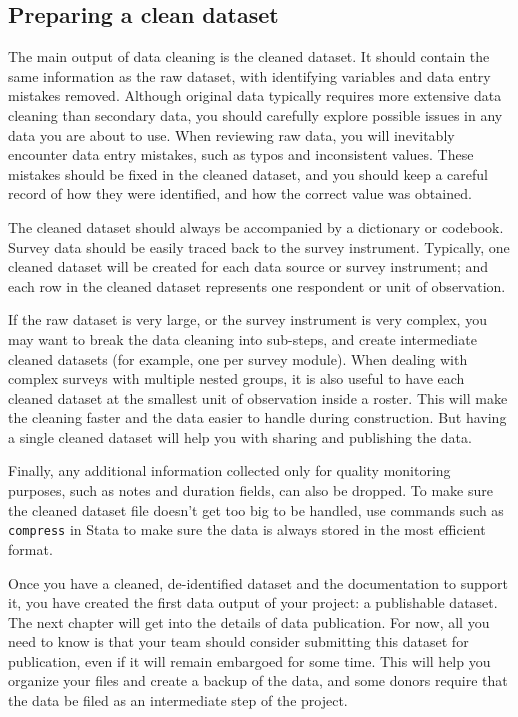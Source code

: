 \subsection{Preparing a clean dataset}
The main output of data cleaning is the cleaned dataset.
It should contain the same information as the raw dataset,
with identifying variables and data entry mistakes removed.
Although original data typically requires more extensive data cleaning than secondary data,
you should carefully explore possible issues in any data you are about to use.
When reviewing raw data, you will inevitably encounter data entry mistakes,
such as typos and inconsistent values.
These mistakes should be fixed in the cleaned dataset,
and you should keep a careful record of how they were identified,
and how the correct value was obtained.

The cleaned dataset should always be accompanied by a dictionary or codebook.
Survey data should be easily traced back to the survey instrument.
Typically, one cleaned dataset will be created for each data source
or survey instrument; and each row in the cleaned dataset represents one
respondent or unit of observation.\cite{tidy-data}

If the raw dataset is very large, or the survey instrument is very complex,
you may want to break the data cleaning into sub-steps,
and create intermediate cleaned datasets
(for example, one per survey module).
When dealing with complex surveys with multiple nested groups,
it is also useful to have each cleaned dataset at the smallest unit of observation inside a roster.
This will make the cleaning faster and the data easier to handle during construction.
But having a single cleaned dataset will help you with sharing and publishing the data.

Finally, any additional information collected only for quality monitoring purposes,
such as notes and duration fields, can also be dropped.
To make sure the cleaned dataset file doesn't get too big to be handled,
use commands such as \texttt{compress} in Stata to make sure the data
is always stored in the most efficient format.

Once you have a cleaned, de-identified dataset and the documentation to support it,
you have created the first data output of your project: a publishable dataset.
The next chapter will get into the details of data publication.
For now, all you need to know is that your team should consider submitting this dataset for publication,
even if it will remain embargoed for some time.
This will help you organize your files and create a backup of the data,
and some donors require that the data be filed as an intermediate step of the project.



